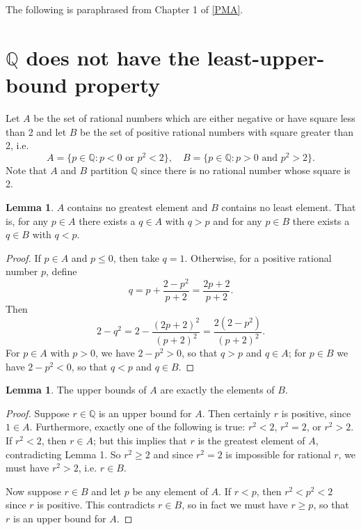 \documentclass[12pt]{article}
\theoremstyle{definition}
\newtheorem{lemma}[theorem]{Lemma}
\begin{document}
The following is paraphrased from Chapter 1 of \hyperlink{pma}{[PMA]}.

\section{\texorpdfstring{\( \mathbb{Q} \)}{} does not have the least-upper-bound property}

Let \( A \) be the set of rational numbers which are either negative or have square less than 2 and let \( B \) be the set of positive rational numbers with square greater than 2, i.e.
\[
    A = \{ p \in \mathbb{Q} : p < 0 \text{ or } p^2 < 2 \}, \quad B = \{ p \in \mathbb{Q} : p > 0 \text{ and } p^2 > 2 \}.
\]
Note that \( A \) and \( B \) partition \( \mathbb{Q} \) since there is no rational number whose square is 2.

\begin{lemma}
\label{lem:no_greatest/least_element}
    \( A \) contains no greatest element and \( B \) contains no least element. That is, for any \( p \in A \) there exists a \( q \in A \) with \( q > p \) and for any \( p \in B \) there exists a \( q \in B \) with \( q < p \).
\end{lemma}

\begin{proof}
    If \( p \in A \) and \( p \leq 0 \), then take \( q = 1 \). Otherwise, for a positive rational number \( p \), define
    \[ q = p + \frac{2 - p^2}{p + 2} = \frac{2p + 2}{p + 2}. \]
    Then
    \[ 2 - q^2 = 2 - \frac{(2p + 2)^2}{(p+2)^2} = \frac{2(2 - p^2)}{(p + 2)^2}. \]
    For \( p \in A \) with \( p > 0 \), we have \( 2 - p^2 > 0 \), so that \( q > p \) and \( q \in A \); for \( p \in B \) we have \( 2 - p^2 < 0 \), so that \( q < p \) and \( q \in B \).
\end{proof}

\begin{lemma}
\label{lem:set_of_upper_bounds_of_A_is_B}
    The upper bounds of \( A \) are exactly the elements of \( B \).
\end{lemma}

\begin{proof}
    Suppose \( r \in \mathbb{Q} \) is an upper bound for \( A \). Then certainly \( r \) is positive, since \( 1 \in A \). Furthermore, exactly one of the following is true: \( r^2 < 2 \), \( r^2 = 2 \), or \( r^2 > 2 \). If \( r^2 < 2 \), then \( r \in A \); but this implies that \( r \) is the greatest element of \( A \), contradicting Lemma 1. So \( r^2 \geq 2 \) and since \( r^2 = 2 \) is impossible for rational \( r \), we must have \( r^2 > 2 \), i.e. \( r \in B \).
    
    Now suppose \( r \in B \) and let \( p \) be any element of \( A \). If \( r < p \), then \( r^2 < p^2 < 2 \) since \( r \) is positive. This contradicts \( r \in B \), so in fact we must have \( r \geq p \), so that \( r \) is an upper bound for \( A \).
\end{proof}
\end{document}
